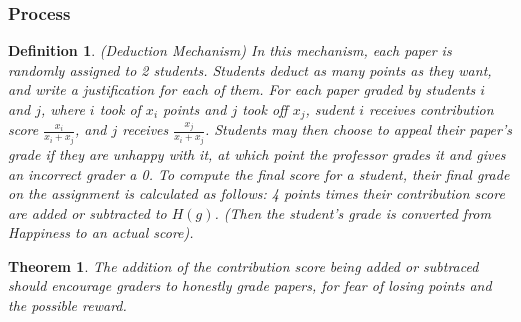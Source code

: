 \documentclass[12pt, Arial]{article}
\newtheorem{theorem}{Theorem}
\newtheorem{definition}{Definition}
\begin{document}
\subsubsection{Process}
\begin{definition}(Deduction Mechanism)
In this mechanism, each paper is randomly assigned to 2 students. Students deduct as many points as they want, and write a justification for each of them. For each paper graded by students $i$ and $j$, where $i$ took of $x_i$ points and $j$ took off $x_j$, sudent $i$ receives contribution score $\frac{x_i}{x_i + x_j}$, and $j$ receives $\frac{x_j}{x_i + x_j}$. Students may then choose to appeal their paper's grade if they are unhappy with it, at which point the professor grades it and gives an incorrect grader a 0. To compute the final score for a student, their final grade on the assignment is calculated as follows: 4 points times their contribution score are added or subtracted to $H(g)$. (Then the student’s grade is converted from Happiness to an actual score).
\end{definition}
\begin{theorem}
The addition of the contribution score being added or subtraced should encourage graders to honestly grade papers, for fear of losing points and the possible reward.
\end{theorem}
\end{document}
